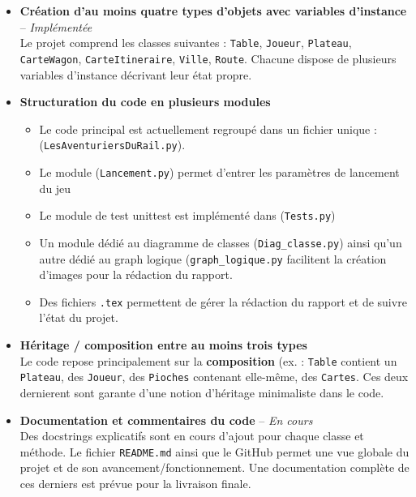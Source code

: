 \documentclass[a4paper,12pt]{report}
\begin{document}
\begin{itemize}
    \item \textbf{Création d’au moins quatre types d’objets avec variables d’instance} – \textit{Implémentée} \\
    Le projet comprend les classes suivantes : \texttt{Table}, \texttt{Joueur}, \texttt{Plateau}, \texttt{CarteWagon},
    \texttt{CarteItineraire}, \texttt{Ville}, \texttt{Route}.
    Chacune dispose de plusieurs variables d’instance décrivant leur état propre.

    \item \textbf{Structuration du code en plusieurs modules}\\
    \begin{itemize}
        \item Le code principal est actuellement regroupé dans un fichier unique : (\texttt{LesAventuriersDuRail.py}).
        \item Le module (\texttt{Lancement.py}) permet d'entrer les paramètres de lancement du jeu
        \item Le module de test unittest est implémenté dans (\texttt{Tests.py})
        \item Un module dédié au diagramme de classes (\texttt{Diag\_classe.py}) ainsi qu'un autre dédié au graph logique
        (\texttt{graph\_logique.py} facilitent la création d'images pour la rédaction du rapport.
        \item Des fichiers \texttt{.tex} permettent de gérer la rédaction du rapport et de suivre l'état du projet.
    \end{itemize}

    \item \textbf{Héritage / composition entre au moins trois types} \\
    Le code repose principalement sur la \textbf{composition}
    (ex. : \texttt{Table} contient un \texttt{Plateau}, des \texttt{Joueur}, des \texttt{Pioches} contenant elle-même,
    des \texttt{Cartes}. Ces deux dernierent sont garante d'une notion d'héritage minimaliste dans le code.

    \item \textbf{Documentation et commentaires du code} – \textit{En cours} \\
    Des docstrings explicatifs sont en cours d’ajout pour chaque classe et méthode.
    Le fichier \texttt{README.md} ainsi que le GitHub permet une vue globale du projet et de son
    avancement/fonctionnement. Une documentation complète de ces derniers est prévue pour la livraison finale.


\end{itemize}
\end{document}
